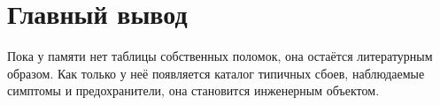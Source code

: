 \section{Главный вывод}

\begin{principle}
Пока у памяти нет таблицы собственных поломок, она остаётся литературным образом.
Как только у неё появляется каталог типичных сбоев, наблюдаемые симптомы и
предохранители, она становится инженерным объектом.
\end{principle}
